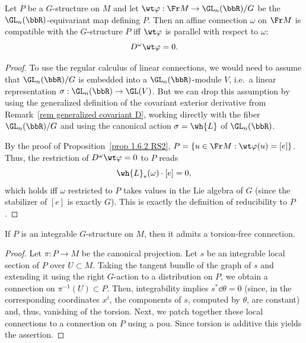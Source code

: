 \begin{prop}[{{\cite[Prop.~2.2.3]{RS2}}}]\label{prop 2.2.3 RS2}
    Let $P$ be a $G$-structure on $M$ and let $\wt\varphi:\Fr M\to \GL_n(\bbR)\slash G$ be the $\GL_n(\bbR)$-equivariant map defining $P$.  Then an affine connection $\omega$ on $\Fr M$ is compatible with the $G$-structure $P$ iff $\wt\varphi$ is parallel with respect to $\omega$:
    \[D^\omega\wt\varphi=0.\]
\end{prop}
\begin{proof}
    To use the regular calculus of linear connections, we would need to assume that $\GL_n(\bbR)\slash G$ is embedded into a $\GL_n(\bbR)$-module $V$, i.e.\ a linear representation $\sigma:\GL_n(\bbR)\to \GL(V)$. But we can drop this assumption by using the generalized definition of the covariant exterior derivative from Remark~\ref{rem generalized covariant D}, working directly with the fiber $\GL_n(\bbR)\slash G$ and using the canonical action $\sigma=\wh{L}$ of $\GL_n(\bbR)$.

    By the proof of Proposition~\ref{prop 1.6.2 RS2}, $P=\{u\in \Fr M:\wt\varphi(u)=[e]\}$. Thus, the restriction of $D^\omega\wt\varphi=0$ to $P$ reads 
    \[\wh{L}_\ast(\omega)\cdot[e]=0,\]
    which holds iff $\omega$ restricted to $P$ takes values in the Lie algebra of $G$ (since the stabilizer of $[e]$ is exactly $G$). This is exactly the definition of reducibility to $P$.
\end{proof}



\begin{prop}[{{\cite[Prop.~2.2.4]{RS2}}}]\label{prop 2.2.4 RS2}
    If $P$ is an integrable $G$-structure on $M$, then it admits a torsion-free connection.
\end{prop}
\begin{proof}
    Let $\pi:P\to M$ be the canonical projection. Let $s$ be an integrable local section of $P$ over $U\subset M$. Taking the tangent bundle of the graph of $s$ and extending it using the right $G$-action to a distribution on $P$, we obtain a connection on $\pi^{-1}(U)\subset P$. Then, integrability implies $s^\ast \dd\theta=0$ (since, in the corresponding coordinates $x^i$, the components of $s$, computed by $\theta$, are constant) and, thus, vanishing of the torsion. Next, we patch together these local connections to a connection on $P$ using a \gls{pou}. Since torsion is additive this yields the assertion.
\end{proof}


